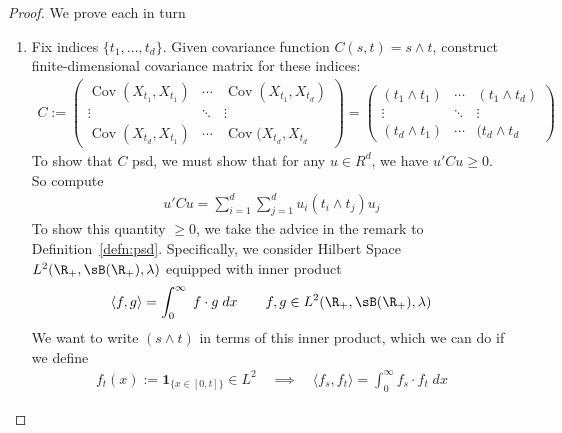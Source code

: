 \documentclass[12pt]{article}
\theoremstyle{plain}
\theoremstyle{definition}
\theoremstyle{remark}
\newcommand{\one}[1]{\mathbf{1}_{#1}}
\newcommand{\Cov}{\operatorname{Cov}}
\begin{document}
\clearpage
\begin{proof}
We prove each in turn
\begin{enumerate}[label=(\roman*)]
  \item
    Fix indices $\{t_1,\ldots,t_d\}$. Given covariance function
    $C(s,t)=s\wedge t$, construct finite-dimensional covariance matrix
    for these indices:
    \begin{align*}
      C
      :=
      \begin{pmatrix}
        \Cov(X_{t_1},X_{t_1}) & \cdots & \Cov(X_{t_1},X_{t_d}) \\
        \vdots & \ddots &\vdots \\
        \Cov(X_{t_d},X_{t_1}) & \cdots & \Cov(X_{t_d},X_{t_d}
      \end{pmatrix}
      =
      \begin{pmatrix}
        (t_1 \wedge t_1) & \cdots & (t_1 \wedge t_d) \\
        \vdots & \ddots &\vdots \\
        (t_d \wedge t_1) & \cdots & (t_d \wedge t_d
      \end{pmatrix}
    \end{align*}
    To show that $C$ psd, we must show that for any $u\in R^d$,
    we have $u'Cu\geq 0$. So compute
    \begin{align}
      u'Cu
      = \sum_{i=1}^d\sum_{j=1}^d
        u_i (t_i\wedge t_j) u_j
      \label{psdbrownian}
    \end{align}
    To show this quantity $\geq 0$,
    we take the advice in the remark to Definition~\ref{defn:psd}.
    Specifically, we consider Hilbert Space
    $L^2(\R_+,\sB(\R_+),\lambda)$ equipped with inner product
    \begin{align*}
      \langle f,g\rangle =
      \int^\infty_0 \; f\cdot g \; dx
      \qquad f,g\in L^2(\R_+,\sB(\R_+),\lambda)
    \end{align*}
    We want to write $(s\wedge t)$ in terms of this inner product, which
    we can do if we define
    \begin{align*}
      f_{t}(x) := \one{\{x\in[0,t]\}}
      \in L^2
      \quad\implies\quad
      \langle f_s,f_t\rangle
      = \int_0^\infty f_{s}\cdot f_{t}\;dx

\end{align*}
\end{enumerate}
\end{proof}
\end{document}
